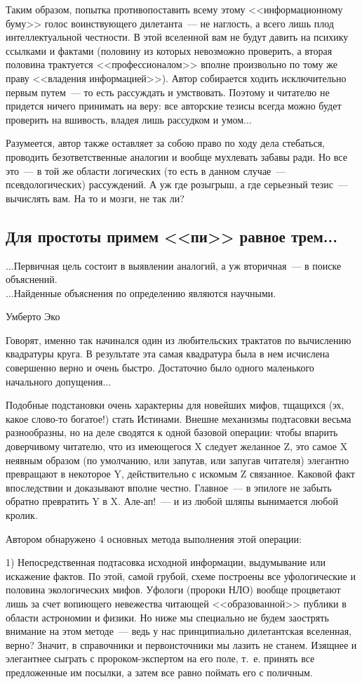 \documentclass{scrbook}
\makeatletter
\newcommand{\defaultepigraphwidth}{0.5} %
\newcommand{\flqq}{<<}
\newcommand{\frqq}{>>}
\newcommand{\mdash}{~--- }
\newcommand{\essaysection}[1]{\subsection*{#1}\nopagebreak}
\newcommand{\myepigraph}[3][\@empty]{
	\ifx\@empty#1
		\setlength{\epigraphwidth}{\defaultepigraphwidth\textwidth}
	\else
		\setlength{\epigraphwidth}{#1\textwidth}
	\fi
	\epigraph{#2}{#3}
	\setlength{\epigraphwidth}{\defaultepigraphwidth\textwidth} %
	\nopagebreak
}
\makeatother
\begin{document}
Таким образом, попытка противопоставить всему этому {\flqq}информационному буму{\frqq} голос воинствующего дилетанта{\mdash}не наглость, а всего лишь плод интеллектуальной честности. В этой вселенной вам не будут давить на психику ссылками и фактами (половину из которых невозможно проверить, а вторая половина трактуется {\flqq}профессионалом{\frqq} вполне произвольно по тому же праву {\flqq}владения информацией{\frqq}). Автор собирается ходить исключительно первым путем{\mdash}то есть рассуждать и умствовать. Поэтому и читателю не придется ничего принимать на веру: все авторские тезисы всегда можно будет проверить на вшивость, владея лишь рассудком и умом...

Разумеется, автор также оставляет за собою право по ходу дела стебаться, проводить безответственные аналогии и вообще мухлевать забавы ради. Но все это{\mdash}в той же области логических (то есть в данном случае{\mdash}псевдологических) рассуждений. А уж где розыгрыш, а где серьезный тезис{\mdash}вычислять вам. На то и мозги, не так ли?

\essaysection{Для простоты примем {\flqq}пи{\frqq} равное трем...}

\myepigraph{...Первичная цель состоит в выявлении аналогий, а уж вторичная{\mdash}в поиске объяснений. \\
...Найденные объяснения по определению являются научными.}
{Умберто Эко}

Говорят, именно так начинался один из любительских трактатов по вычислению квадратуры круга. В результате эта самая квадратура была в нем исчислена совершенно верно и очень быстро. Достаточно было одного маленького начального допущения...

Подобные подстановки очень характерны для новейших мифов, тщащихся (эх, какое слово-то богатое!) стать Истинами. Внешне механизмы подтасовки весьма разнообразны, но на деле сводятся к одной базовой операции: чтобы впарить доверчивому читателю, что из имеющегося X следует желанное Z, это самое X неявным образом (по умолчанию, или запутав, или запугав читателя) элегантно превращают в некоторое Y, действительно с искомым Z связанное. Каковой факт впоследствии и доказывают вполне честно. Главное{\mdash}в эпилоге не забыть обратно превратить Y в X. Але-ап!{\mdash}и из любой шляпы вынимается любой кролик.

Автором обнаружено 4 основных метода выполнения этой операции:

1) Непосредственная подтасовка исходной информации, выдумывание или искажение фактов. По этой, самой грубой, схеме построены все уфологические и половина экологических мифов. Уфологи (пророки НЛО) вообще процветают лишь за счет вопиющего невежества читающей {\flqq}образованной{\frqq} публики в области астрономии и физики. Но ниже мы специально не будем заострять внимание на этом методе{\mdash}ведь у нас принципиально дилетантская вселенная, верно? Значит, в справочники и первоисточники мы лазить не станем. Изящнее и элегантнее сыграть с пророком-экспертом на его поле, т.~е. принять все предложенные им посылки, а затем все равно поймать его с поличным.
\end{document}
